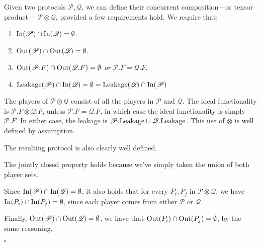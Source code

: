 \begin{definition}
Given two protocols $\mathscr{P}, \mathscr{Q}$,
we can define their concurrent composition---or tensor product---
$\mathscr{P} \otimes \mathscr{Q}$, provided a few requirements hold.
We require that:
\begin{enumerate}
\item $\text{In}(\mathscr{P}) \cap \text{In}(\mathscr{Q}) = \emptyset$.
\item $\text{Out}(\mathscr{P}) \cap \text{Out}(\mathscr{Q}) = \emptyset$.
\item $\text{Out}(\mathscr{P}.F) \cap \text{Out}(\mathscr{Q}.F) = \emptyset$ \emph{or} $\mathscr{P}.F = \mathscr{Q}.F$.
\item $\text{Leakage}(\mathscr{P}) \cap \text{In}(\mathscr{Q}) = \emptyset = \text{Leakage}(\mathscr{Q}) \cap \text{In}(\mathscr{P})$
\end{enumerate}

The players of $\mathscr{P} \otimes \mathscr{Q}$ consist of all the players
in $\mathscr{P}$ and $\mathscr{Q}$.
The ideal functionality is $\mathscr{P}.F \otimes \mathscr{Q}.F$, 
unless $\mathscr{P}.F = \mathscr{Q}.F$, in which case the ideal functionality
is simply $\mathscr{P}.F$.
In either case, the leakage is $\mathscr{P}.\text{Leakage} \cup \mathscr{Q}.\text{Leakage}$.
This use of $\otimes$ is well defined by assumption.

The resulting protocol is also clearly well defined.

The jointly closed property holds because we've simply taken the union
of both player sets.

Since $\text{In}(\mathscr{P}) \cap \text{In}(\mathscr{Q}) = \emptyset$,
it also holds that for every $P_i, P_j$ in $\mathscr{P} \otimes \mathscr{Q}$,
we have $\text{In}(P_i) \cap \text{In}(P_j) = \emptyset$,
since each player comes from either $\mathscr{P}$ or $\mathscr{Q}$.
      
Finally, $\text{Out}(\mathscr{P}) \cap \text{Out}(\mathscr{Q}) = \emptyset$,
we have that $\text{Out}(P_i) \cap \text{Out}(P_j) = \emptyset$,
by the same reasoning.
    
$\square$
\end{definition}


